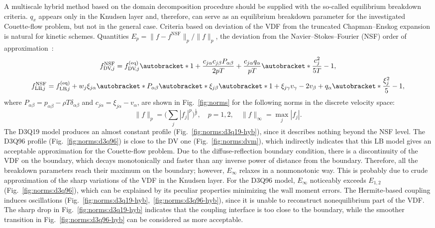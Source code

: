 \documentclass{elsarticle} %
\DeclarePairedDelimiter\autobracket()       %
\newcommand{\br}[1]{\autobracket*{#1}}
\newcommand{\equil}[1]{#1^\mathrm{(eq)}}
\newcommand{\LB}{\mathrm{LB}\!}
\newcommand{\DV}{\mathrm{DV}\!}
\newcommand{\xiai}{\xi_{j \alpha}}
\newcommand{\xiaj}{\xi_{j \beta}}
\newcommand{\xiak}{\xi_{j \gamma}}
\newcommand{\cai}{c_{j \alpha}}
\newcommand{\caj}{c_{j \beta}}
\begin{document}
A multiscale hybrid method based on the domain decomposition procedure should be supplied with the so-called equilibrium breakdown criteria.
\(q_x\) appears only in the Knudsen layer and, therefore, can serve as an equilibrium breakdown parameter
for the investigated Couette-flow problem, but not in the general case.
Criteria based on deviation of the VDF from the truncated Chapman--Enskog expansion is natural for kinetic schemes.
Quantities \(E_p=\|f-f^{\mathrm{NSF}}\|_p/\|f\|_p\), the deviation from the Navier--Stokes--Fourier (NSF) order of approximation~\cite{Zhang2014}:
\begin{gather}
    f^{\mathrm{NSF}}_{\DV,j} = \equil{f}_{\DV,j}\br{
        1 + \frac{\cai\caj P_{\alpha\beta}}{2pT} + \frac{\cai q_\alpha}{pT}\br{ \frac{c_j^2}{5T} - 1 } }, \label{eq:NSF_DV} \\
    f^{\mathrm{NSF}}_{\LB,j} = \equil{f}_{\LB,j} + w_j\xiai\br{
         P_{\alpha\beta}\br{\xiaj\br{1 + \xiak v_\gamma} - 2 v_\beta } + q_\alpha\br{ \frac{\xi_j^2}5 - 1 } }, \label{eq:NSF_LB}
\end{gather}
where \(P_{\alpha\beta} = p_{\alpha\beta} - \rho T\delta_{\alpha\beta}\) and \(\cai = \xiai - v_\alpha\),
are shown in Fig.~\ref{fig:norms} for the following norms in the discrete velocity space:
\begin{equation}\label{eq:norms}
    \|f\|_p = \bigg(\sum_j |f_j|^p \bigg)^\frac1p, \quad p=1,2, \quad \|f\|_\infty = \max_j |f_j|.
\end{equation}
The D3Q19 model produces an almost constant profile (Fig.~\ref{fig:norms:d3q19-hyb}),
since it describes nothing beyond the NSF level.
The D3Q96 profile (Fig.~\ref{fig:norms:d3q96}) is close to the DV one (Fig.~\ref{fig:norms:dvm}),
which indirectly indicates that this LB model gives an acceptable approximation for the Couette-flow problem.
Due to the diffuse-reflection boundary condition, there is a discontinuity of the VDF on the boundary,
which decays monotonically and faster than any inverse power of distance from the boundary.
Therefore, all the breakdown parameters reach their maximum on the boundary;
however, \(E_\infty\) relaxes in a nonmonotonic way.
This is probably due to crude approximation of the sharp variations of the VDF in the Knudsen layer.
For the D3Q96 model, \(E_\infty\) noticeably exceeds \(E_{1,2}\) (Fig.~\ref{fig:norms:d3q96}),
which can be explained by its peculiar properties minimizing the wall moment errors.
The Hermite-based coupling induces oscillations (Fig.~\ref{fig:norms:d3q19-hyb},~\ref{fig:norms:d3q96-hyb}),
since it is unable to reconstruct nonequilibrium part of the VDF.
The sharp drop in Fig.~\ref{fig:norms:d3q19-hyb} indicates that the coupling interface is too close to the boundary,
while the smoother transition in Fig.~\ref{fig:norms:d3q96-hyb} can be considered as more acceptable.
\end{document}

